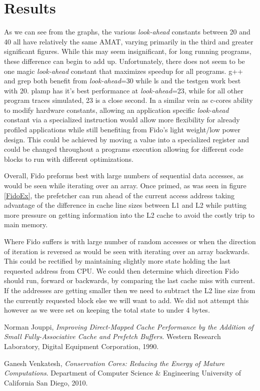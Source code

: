 \documentclass[11pt]{article}
\begin{document}
\section{Results}
As we can see from the graphs, the various \textit{look-ahead} constants between 20 and 40 all have relatively the same AMAT, varying primarily in the third and greater significant figures. While this may seem insignificant, for long running programs, these difference can begin to add up. Unfortunately, there does not seem to be one magic \textit{look-ahead} constant that maximizes speedup for all programs. g++ and grep both benefit from \textit{look-ahead}=30 while ls and the testgen work best with 20. plamp has it's best performance at \textit{look-ahead}=23, while for all other program traces simulated, 23 is a close second. In a similar vein as c-cores\cite{Ccore} ability to modify hardware constants, allowing an application specific \textit{look-ahead} constant via a specialized instruction would allow more flexibility for already profiled applications while still benefiting from Fido's light weight/low power design. This could be achieved by moving a value into a specialized register and could be changed throughout a programs execution allowing for different code blocks to run with different optimizations. 

Overall, Fido preforms best with large numbers of sequential data accesses, as would be seen while iterating over an array. Once primed, as was seen in figure \ref{FidoEx}, the prefetcher can run ahead of the current access address taking advantage of the difference in cache line sizes between L1 and L2 while putting more pressure on getting information into the L2 cache to avoid the costly trip to main memory. 

Where Fido suffers is with large number of random accesses or when the direction of iteration is reversed as would be seen with iterating over an array backwards. This could be rectified by maintaining slightly more state holding the last requested address from CPU. We could then determine which direction Fido should run, forward or backwards, by comparing the last cache miss with current. If the addresses are getting smaller then we need to subtract the L2 line size from the currently requested block else we will want to add. We did not attempt this however as we were set on keeping the total state to under 4 bytes. 

\begin{thebibliography}{9}

  Norman Jouppi,
  \emph{Improving Direct-Mapped Cache Performance by the Addition of Small Fully-Associative Cache and Prefetch Buffers}.
  Western Research Laboratory, Digital Equipment Corporation,
  1990.

  Ganesh Venkatesh,
  \emph{Conservation Cores: Reducing the Energy of Mature Computations}.
  Department of Computer Science \& Engineering University of California San Diego,
  2010.
\end{thebibliography}
\end{document}
